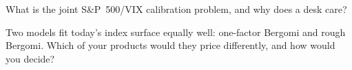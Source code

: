\begin{interviewq}\label{iq:dv:rough-volatility-and-forward-variance-models:5}
What is the joint S\&P~500/VIX calibration problem, and why does a desk care?
\end{interviewq}

\begin{interviewq}\label{iq:dv:rough-volatility-and-forward-variance-models:6}
Two models fit today's index surface equally well: one-factor Bergomi and rough Bergomi. Which of your products
would they price differently, and how would you decide?
\end{interviewq}
